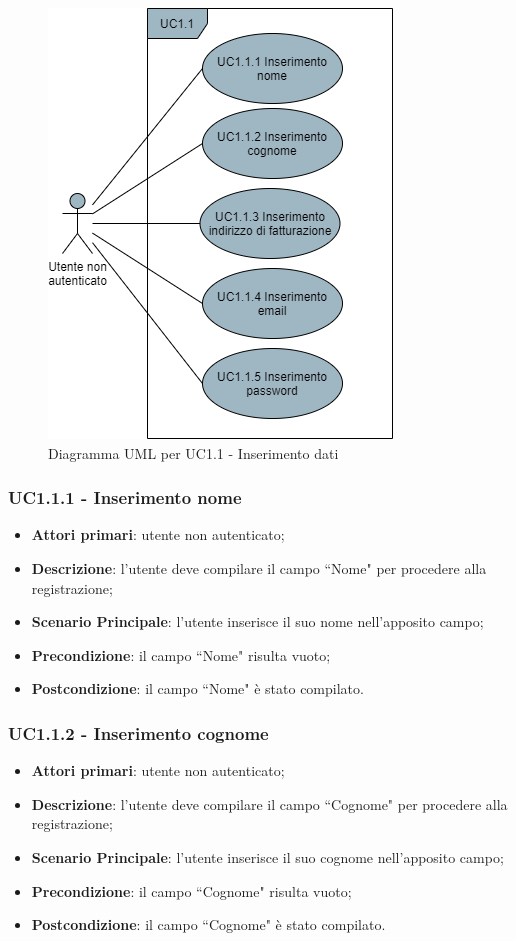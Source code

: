 \begin{figure}[H]
\centering
\includegraphics[scale=0.6]{res/UseCase/Immagini/InserimentoDatiRegistrazione}
\caption{Diagramma UML per UC1.1 - Inserimento dati}
\end{figure}


\subsubsection{UC1.1.1 - Inserimento nome}
\begin{itemize}
\item \textbf{Attori primari}: utente non autenticato;
\item \textbf{Descrizione}: l'utente deve compilare il campo ``Nome" per procedere alla registrazione;
\item \textbf{Scenario Principale}: l'utente inserisce il suo nome nell'apposito campo;
\item \textbf{Precondizione}: il campo ``Nome" risulta vuoto;
\item \textbf{Postcondizione}: il campo ``Nome" è stato compilato.
\end{itemize}

\subsubsection{UC1.1.2 - Inserimento cognome}
\begin{itemize}
\item \textbf{Attori primari}: utente non autenticato;
\item \textbf{Descrizione}: l'utente deve compilare il campo ``Cognome" per procedere alla registrazione;
\item \textbf{Scenario Principale}: l'utente inserisce il suo cognome nell'apposito campo;
\item \textbf{Precondizione}: il campo ``Cognome" risulta vuoto;
\item \textbf{Postcondizione}: il campo ``Cognome" è stato compilato.
\end{itemize}

